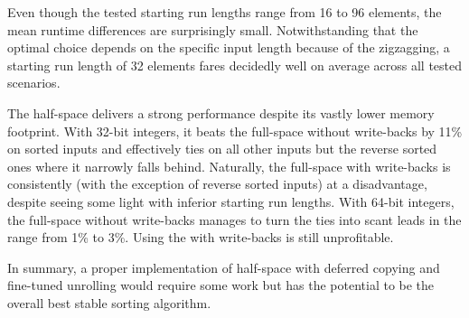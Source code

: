 Even though the tested starting run lengths range from 16 to 96 elements, the mean runtime differences are surprisingly small.
Notwithstanding that the optimal choice depends on the specific input length because of the zigzagging, a starting run length of 32 elements fares decidedly well on average across all tested scenarios.

The half-space \MS{} delivers a strong performance despite its vastly lower memory footprint.
With 32-bit integers, it beats the full-space \MS{} without write-backs by 11\% on sorted inputs and effectively ties on all other inputs but the reverse sorted ones where it narrowly falls behind.
Naturally, the full-space \MS{} with write-backs is consistently (with the exception of reverse sorted inputs) at a disadvantage, despite seeing some light with inferior starting run lengths.
With 64-bit integers, the full-space \MS{} without write-backs manages to turn the ties into scant leads in the range from 1\% to 3\%.
Using the \MS{} with write-backs is still unprofitable.

In summary, a proper implementation of half-space \MS{} with deferred copying and fine-tuned unrolling would require some work but has the potential to be the overall best stable sorting algorithm.
